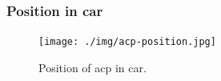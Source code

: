 \subsubsection{Position in car}

\begin{figure}[H]
	\centering
	\texttt{[image: ./img/acp-position.jpg]}
	\caption{Position of \gls{acp} in car.}
	\label{fig:ACP-position}
\end{figure}

